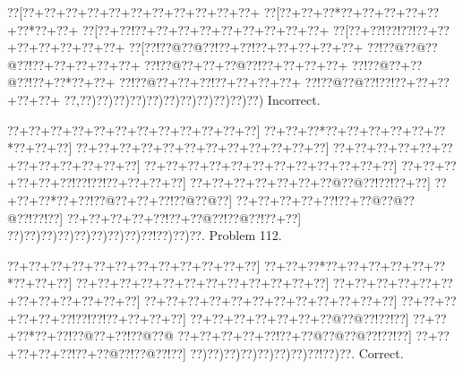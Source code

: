\documentclass[a5paper]{article}
\begin{document}
\begin{center}
{\goo
\0??[\0??+\0??+\0??+\0??+\0??+\0??+\0??+\0??+\0??+\0??+\0??+
\0??[\0??+\0??+\0??*\0??+\0??+\0??+\0??+\0??+\0??*\0??+\0??+
\0??[\0??+\0??!\0??+\0??+\0??+\0??+\0??+\0??+\0??+\0??+\0??+
\0??[\0??+\0??!\0??!\0??!\0??+\0??+\0??+\0??+\0??+\0??+\0??+
\0??[\0??!\0??@\0??@\0??!\0??+\0??!\0??+\0??+\0??+\0??+\0??+
\0??!\0??@\0??@\0??@\0??!\0??+\0??+\0??+\0??+\0??+
\0??!\0??@\0??+\0??+\0??@\0??!\0??+\0??+\0??+\0??+
\0??!\0??@\0??+\0??@\0??!\0??+\0??*\0??+\0??+
\0??!\0??@\0??+\0??+\0??!\0??+\0??+\0??+\0??+
\0??!\0??@\0??@\0??!\0??!\0??+\0??+\0??+\0??+\0??+
\0??,\0??)\0??)\0??)\0??)\0??)\0??)\0??)\0??)\0??)\0??)\0??)
}
Incorrect. 

\end{center}
\newpage
\begin{center}
{\goo
\0??+\0??+\0??+\0??+\0??+\0??+\0??+\0??+\0??+\0??+\0??+\0??]
\0??+\0??+\0??*\0??+\0??+\0??+\0??+\0??+\0??*\0??+\0??+\0??]
\0??+\0??+\0??+\0??+\0??+\0??+\0??+\0??+\0??+\0??+\0??+\0??]
\0??+\0??+\0??+\0??+\0??+\0??+\0??+\0??+\0??+\0??+\0??+\0??]
\0??+\0??+\0??+\0??+\0??+\0??+\0??+\0??+\0??+\0??+\0??+\0??]
\0??+\0??+\0??+\0??+\0??+\0??!\0??!\0??!\0??+\0??+\0??+\0??]
\0??+\0??+\0??+\0??+\0??+\0??+\0??@\0??@\0??!\0??!\0??+\0??]
\0??+\0??+\0??*\0??+\0??!\0??@\0??+\0??+\0??!\0??@\0??@\0??]
\0??+\0??+\0??+\0??+\0??!\0??+\0??@\0??@\0??@\0??!\0??!\0??]
\0??+\0??+\0??+\0??+\0??!\0??+\0??@\0??!\0??@\0??!\0??+\0??]
\0??)\0??)\0??)\0??)\0??)\0??)\0??)\0??)\0??!\0??)\0??)\0??.
}
Problem 112.

\end{center}
\begin{center}
{\goo
\0??+\0??+\0??+\0??+\0??+\0??+\0??+\0??+\0??+\0??+\0??+\0??]
\0??+\0??+\0??*\0??+\0??+\0??+\0??+\0??+\0??*\0??+\0??+\0??]
\0??+\0??+\0??+\0??+\0??+\0??+\0??+\0??+\0??+\0??+\0??+\0??]
\0??+\0??+\0??+\0??+\0??+\0??+\0??+\0??+\0??+\0??+\0??+\0??]
\0??+\0??+\0??+\0??+\0??+\0??+\0??+\0??+\0??+\0??+\0??+\0??]
\0??+\0??+\0??+\0??+\0??+\0??!\0??!\0??!\0??+\0??+\0??+\0??]
\0??+\0??+\0??+\0??+\0??+\0??+\0??@\0??@\0??!\0??!\0??]
\0??+\0??+\0??*\0??+\0??!\0??@\0??+\0??!\0??@\0??@
\0??+\0??+\0??+\0??+\0??!\0??+\0??@\0??@\0??@\0??!\0??!\0??]
\0??+\0??+\0??+\0??+\0??!\0??+\0??@\0??!\0??@\0??!\0??]
\0??)\0??)\0??)\0??)\0??)\0??)\0??)\0??!\0??)\0??.
}
Correct. 

\end{center}
\end{document}
